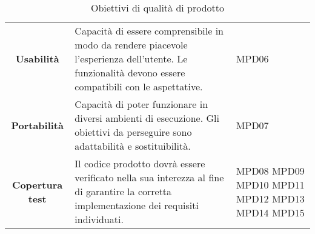 \begin{table}[H]
\begin{tabular}{c|p{8cm}|p{2cm}}
    \textbf{Usabilità}                                           & Capacità di essere comprensibile in modo da rendere piacevole l'esperienza dell'utente. Le funzionalità devono essere compatibili con le aspettative. & MPD06                   \\
    \textbf{Portabilità}                                         & Capacità di poter funzionare in diversi ambienti di esecuzione. Gli obiettivi da perseguire sono adattabilità e sostituibilità.                       & MPD07                   \\
    \textbf{Copertura test}                                      & Il codice prodotto dovrà essere verificato nella sua interezza al fine di garantire la corretta implementazione dei requisiti individuati.            & MPD08 MPD09 MPD10 MPD11 MPD12 MPD13 MPD14 MPD15 \\
  \end{tabular}
  \caption{Obiettivi di qualità di prodotto}
\end{table}


